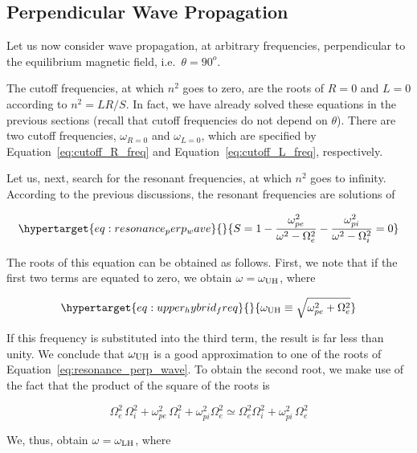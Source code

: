 \documentclass[
  notoc %
]{tufte-book}
\begin{document}
\hypertarget{perpendicular-wave-propagation}{%
\subsection{Perpendicular Wave
Propagation}\label{perpendicular-wave-propagation}}

Let us now consider wave propagation, at arbitrary frequencies,
perpendicular to the equilibrium magnetic field, i.e.~\(\theta=90^o\).

The cutoff frequencies, at which \(n^2\) goes to zero, are the roots of
\(R=0\) and \(L=0\) according to \(n^2=LR/S\). In fact, we have already
solved these equations in the previous sections (recall that cutoff
frequencies do not depend on \(\theta\)). There are two cutoff
frequencies, \(\omega_{R=0}\) and \(\omega_{L=0}\), which are specified
by Equation~\ref{eq:cutoff_R_freq} and Equation~\ref{eq:cutoff_L_freq},
respectively.

Let us, next, search for the resonant frequencies, at which \(n^2\) goes
to infinity. According to the previous discussions, the resonant
frequencies are solutions of

\begin{equation}\protect\hypertarget{eq:resonance_perp_wave}{}{
S = 1 - \frac{\omega_{pe}^2}{\omega^2 - \Omega_e^2} - \frac{\omega_{pi}^2}{\omega^2 - \Omega_i^2} = 0
}\label{eq:resonance_perp_wave}\end{equation}

The roots of this equation can be obtained as follows. First, we note
that if the first two terms are equated to zero, we obtain
\(\omega=\omega_{\rm UH}\), where

\begin{equation}\protect\hypertarget{eq:upper_hybrid_freq}{}{
\omega_{\rm UH} \equiv \sqrt{\omega_{pe}^2 + \Omega_e^2}
}\label{eq:upper_hybrid_freq}\end{equation}

If this frequency is substituted into the third term, the result is far
less than unity. We conclude that \(\omega_{\rm UH}\) is a good
approximation to one of the roots of
Equation~\ref{eq:resonance_perp_wave}. To obtain the second root, we
make use of the fact that the product of the square of the roots is

\[
\Omega_e^2\,\Omega_i^2 + \omega_{pe}^2\,\Omega_i^2 + \omega_{pi}^2\Omega_e^2 \simeq \Omega_e^2 \Omega_i^2 + \omega_{pi}^2\,\Omega_e^2
\]

We, thus, obtain \(\omega= \omega_{\rm LH}\), where
\end{document}

